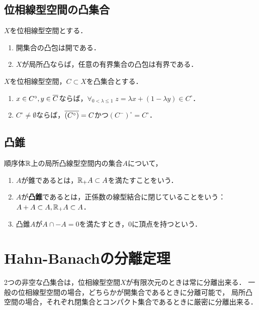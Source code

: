 \documentclass[uplatex,dvipdfmx]{jsreport}
\begin{document}
\subsection{位相線型空間の凸集合}

\begin{proposition}
    $X$を位相線型空間とする．
    \begin{enumerate}
        \item 開集合の凸包は開である．
        \item $X$が局所凸ならば，任意の有界集合の凸包は有界である．
    \end{enumerate}
\end{proposition}

\begin{proposition}[凸集合の正則性]
    $X$を位相線型空間，$C\subset X$を凸集合とする．
    \begin{enumerate}
        \item $x\in C^\circ,y\in\overline{C}$ならば，$\forall_{0<\lambda\le1}\;z=\lambda x+(1-\lambda y)\in C^\circ$．
        \item $C^\circ\ne\emptyset$ならば，$\overline{(C^\circ)}=C$かつ$(C^-)^\circ=C^\circ$．
    \end{enumerate}
\end{proposition}

\subsection{凸錐}

\begin{definition}
    順序体$\mathbb{R}$上の局所凸線型空間内の集合$A$について，
    \begin{enumerate}
        \item $A$が錐であるとは，$\mathbb{R}_+A\subset A$を満たすことをいう．
        \item $A$が\textbf{凸錐}であるとは，正係数の線型結合に閉じていることをいう：$A+A\subset A,\mathbb{R}_+A\subset A$．
        \item 凸錐$A$が$A\cap -A=0$を満たすとき，$0$に頂点を持つという．
    \end{enumerate}
\end{definition}

\section{Hahn-Banachの分離定理}

\begin{tcolorbox}[colframe=ForestGreen, colback=ForestGreen!10!white,breakable,colbacktitle=ForestGreen!40!white,coltitle=black,fonttitle=\bfseries\sffamily,
title=]
    2つの非空な凸集合は，位相線型空間$X$が有限次元のときは常に分離出来る．
    一般の位相線型空間の場合，どちらかが開集合であるときに分離可能で，
    局所凸空間の場合，それぞれ閉集合とコンパクト集合であるときに厳密に分離出来る．
\end{tcolorbox}
\end{document}
